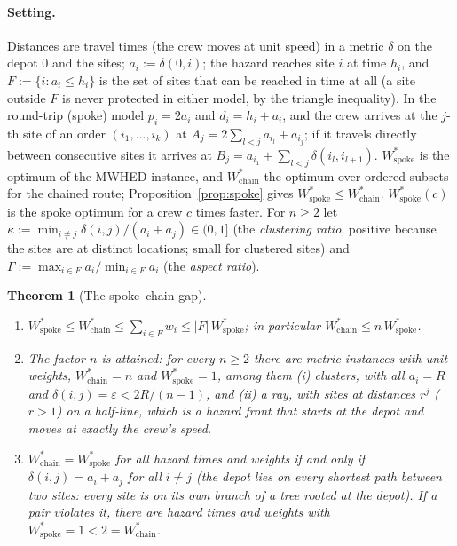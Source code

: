 \documentclass[pdflatex,sn-mathphys-ay]{sn-jnl}
\theoremstyle{thmstyleone}
\newtheorem{theorem}{Theorem}
\theoremstyle{thmstyletwo}
\theoremstyle{thmstylethree}
\begin{document}
\paragraph{Setting.} Distances are travel times (the crew moves at unit
speed) in a metric $\delta$ on the depot $0$ and the sites; $a_i:=\delta(0,i)$;
the hazard reaches site $i$ at time $h_i$, and $F:=\{i:a_i\le h_i\}$ is the
set of sites that can be reached in time at all (a site outside $F$ is
never protected in either model, by the triangle inequality). In the
round-trip (spoke) model $p_i=2a_i$ and $d_i=h_i+a_i$, and the crew
arrives at the $j$-th site of an order $(i_1,\dots,i_k)$ at
$A_j=2\sum_{l<j}a_{i_l}+a_{i_j}$; if it travels directly between
consecutive sites it arrives at $B_j=a_{i_1}+\sum_{l<j}\delta(i_l,i_{l+1})$.
$W^\ast_{\mathrm{spoke}}$ is the optimum of the MWHED instance, and
$W^\ast_{\mathrm{chain}}$ the optimum over ordered subsets for the chained
route; Proposition~\ref{prop:spoke} gives
$W^\ast_{\mathrm{spoke}}\le W^\ast_{\mathrm{chain}}$. $W^\ast_{\mathrm{spoke}}(c)$
is the spoke optimum for a crew $c$ times faster. For $n\ge2$ let
$\kappa:=\min_{i\ne j}\delta(i,j)/(a_i+a_j)\in(0,1]$ (the \emph{clustering ratio}, positive because the sites are at distinct locations; small for clustered sites) and $\Gamma:=\max_{i\in F}a_i/\min_{i\in F}a_i$
(the \emph{aspect ratio}).

\begin{theorem}[The spoke--chain gap]\label{thm:gap}
\begin{enumerate}
\item[(a)] $W^\ast_{\mathrm{spoke}}\le W^\ast_{\mathrm{chain}}\le\sum_{i\in F}w_i\le|F|\,W^\ast_{\mathrm{spoke}}$; in particular
$W^\ast_{\mathrm{chain}}\le n\,W^\ast_{\mathrm{spoke}}$.
\item[(b)] The factor $n$ is attained: for every $n\ge2$ there are metric
instances with unit weights, $W^\ast_{\mathrm{chain}}=n$ and
$W^\ast_{\mathrm{spoke}}=1$, among them (i) \emph{clusters}, with all
$a_i=R$ and $\delta(i,j)=\varepsilon<2R/(n-1)$, and (ii) a \emph{ray}, with sites at
distances $r^j$ ($r>1$) on a half-line, which is a hazard front that
starts at the depot and moves at exactly the crew's speed.
\item[(c)] $W^\ast_{\mathrm{chain}}=W^\ast_{\mathrm{spoke}}$ for all
hazard times and weights if and only if $\delta(i,j)=a_i+a_j$ for all
$i\ne j$ (the depot lies on every shortest path between two sites: every
site is on its own branch of a tree rooted at the depot). If a pair violates it, there are
hazard times and weights with $W^\ast_{\mathrm{spoke}}=1<2=W^\ast_{\mathrm{chain}}$.
\end{enumerate}
\end{theorem}
\end{document}
